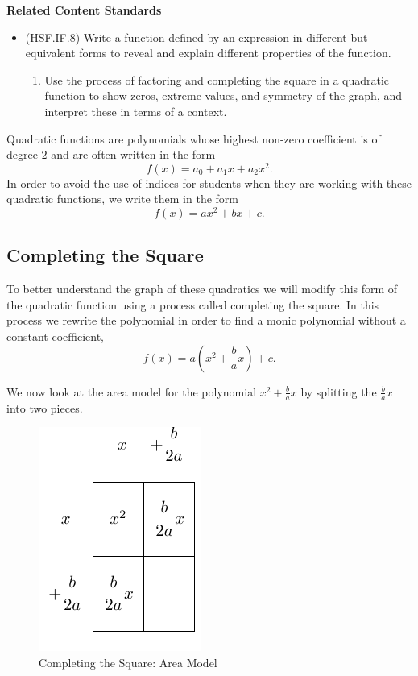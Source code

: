 \documentclass[
]{book}
\providecommand{\tightlist}{%
  \setlength{\itemsep}{0pt}\setlength{\parskip}{0pt}}
\newenvironment{standards}{}{}
\theoremstyle{definition}
\theoremstyle{definition}
\theoremstyle{definition}
\theoremstyle{definition}
\theoremstyle{remark}
\begin{document}
\begin{standards}

\begin{center}
\textbf{Related Content Standards}

\end{center}

\begin{itemize}
\tightlist
\item
  (HSF.IF.8) Write a function defined by an expression in different but equivalent forms to reveal and explain different properties of the function.

  \begin{enumerate}
  \def\labelenumi{\alph{enumi}.}
  \tightlist
  \item
    Use the process of factoring and completing the square in a quadratic function to show zeros, extreme values, and symmetry of the graph, and interpret these in terms of a context.
  \end{enumerate}
\end{itemize}

\end{standards}

Quadratic functions are polynomials whose highest non-zero coefficient is of degree \(2\) and are often written in the form \[f(x)=a_0 + a_1 x + a_2 x^2.\] In order to avoid the use of indices for students when they are working with these quadratic functions, we write them in the form
\[f(x)=ax^2 + bx +c.\]

\hypertarget{completing-the-square}{%
\subsection{Completing the Square}\label{completing-the-square}}

To better understand the graph of these quadratics we will modify this form of the quadratic function using a process called completing the square. In this process we rewrite the polynomial in order to find a monic polynomial without a constant coefficient,
\[f(x) = a \left( x^2 +\frac{b}{a}x \right) + c.\]

We now look at the area model for the polynomial \(x^2+\frac{b}{a}x\) by splitting the \(\frac{b}{a}x\) into two pieces.

\begin{figure}

{\centering \includegraphics[width=0.2\linewidth]{tikz/completing-square} 

}

\caption{Completing the Square: Area Model}\label{fig:unnamed-chunk-72}
\end{figure}
\end{document}

